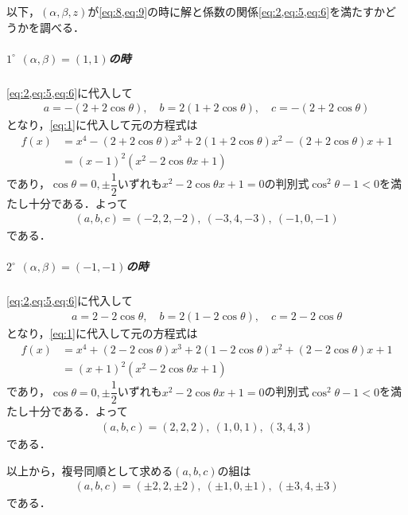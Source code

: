 \documentclass[../../main.tex]{subfiles}
\begin{document}
以下，$(\alpha,\beta,z)$が\cref{eq:8,eq:9}の時に解と係数の関係\cref{eq:2,eq:5,eq:6}を満たすかどうかを調べる．

\subparagraph{$1^\circ$ $(\alpha,\beta)=(1,1)$の時}

\cref{eq:2,eq:5,eq:6}に代入して
\begin{align}
  a = - (2+2\cos\theta),
  \quad
  b = 2(1+2\cos\theta),
  \quad
  c = -(2+2\cos\theta)
\end{align}
となり，\cref{eq:1}に代入して元の方程式は
\begin{align}
  f(x)
  &=x^4-(2+2\cos\theta)x^3+2(1+2\cos\theta)x^2-(2+2\cos\theta)x+1 \\
  &=(x-1)^2(x^2-2\cos\theta x+1)
\end{align}
であり，$\cos\theta = 0, \pm\dfrac{1}{2}$いずれも$x^2-2\cos\theta x+1=0$の判別式$\cos^2\theta-1<0$を満たし十分である．よって
\begin{align}
  (a,b,c)=(-2,2,-2),\ (-3,4,-3),\ (-1,0,-1) \label{eq:10}
\end{align}
である．

\subparagraph{$2^\circ$ $(\alpha,\beta)=(-1,-1)$の時}

\cref{eq:2,eq:5,eq:6}に代入して
\begin{align}
  a=2-2\cos\theta,\quad b=2(1-2\cos\theta),\quad c=2-2\cos\theta
\end{align}
となり，\cref{eq:1}に代入して元の方程式は
\begin{align}
  f(x)
  &=x^4+(2-2\cos\theta)x^3+2(1-2\cos\theta)x^2+(2-2\cos\theta)x+1 \\
  &=(x+1)^2(x^2-2\cos\theta x+1)
\end{align}
であり，$\cos\theta = 0, \pm\dfrac{1}{2}$いずれも$x^2-2\cos\theta x+1=0$の判別式$\cos^2\theta-1<0$を満たし十分である．よって
\begin{align}
  (a,b,c)=(2,2,2),\ (1,0,1),\ (3,4,3)
\end{align}
である．
\casesend

以上から，複号同順として求める$(a,b,c)$の組は
\begin{align}
  (a,b,c)=(\pm2,2,\pm2),\ (\pm1,0,\pm1),\ (\pm3,4,\pm3)
\end{align}
である．

\newpage
\end{document}
